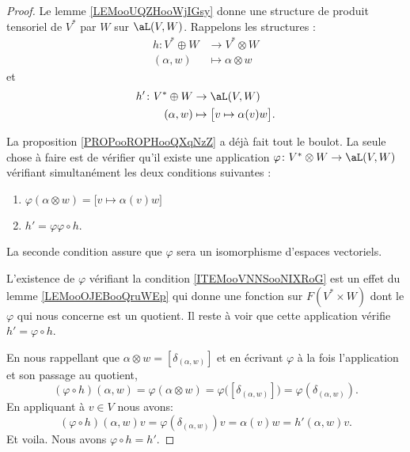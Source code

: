 \begin{proof}
    Le lemme \ref{LEMooUQZHooWjIGsy} donne une structure de produit tensoriel de \( V^*\) par \( W\) sur \( \aL(V,W)\). Rappelons les structures :
    \begin{equation}
        \begin{aligned}
            h\colon V^*\oplus W&\to V^*\otimes W \\
            (\alpha,w)&\mapsto \alpha\otimes w 
        \end{aligned}
    \end{equation}
    et
    \begin{equation}
        \begin{aligned}
            h'\colon V^*\oplus W&\to \aL(V,W) \\
            (\alpha,w)&\mapsto \big[ v\mapsto \alpha(v)w \big].
        \end{aligned}
    \end{equation}

    La proposition \ref{PROPooROPHooQXqNzZ} a déjà fait tout le boulot. La seule chose à faire est de vérifier qu'il existe une application \( \varphi\colon V^*\otimes W\to \aL(V,W)\) vérifiant simultanément les deux conditions suivantes :
    \begin{enumerate}
        \item       \label{ITEMooVNNSooNIXRoG}
            \( \varphi(\alpha\otimes w)=\big[ v\mapsto \alpha(v)w \big]\)
        \item 
            \( h'=\varphi\varphi\circ h\).
    \end{enumerate}
    La seconde condition assure que \( \varphi\) sera un isomorphisme d'espaces vectoriels.

    L'existence de \( \varphi\) vérifiant la condition \ref{ITEMooVNNSooNIXRoG} est un effet du lemme \ref{LEMooOJEBooQruWEp} qui donne une fonction sur \( F(V^*\times W)\) dont le \( \varphi\) qui nous concerne est un quotient. Il reste à voir que cette application vérifie \( h'=\varphi\circ h\).
    
    En nous rappellant que \( \alpha\otimes w=[\delta_{(\alpha,w)}]\) et en écrivant \( \varphi\) à la fois l'application et son passage au quotient,
    \begin{equation}
        (\varphi\circ h)(\alpha,w)=\varphi(\alpha\otimes w)=\varphi\big( [\delta_{(\alpha,w)}] \big)=\varphi(\delta_{(\alpha,w)}).
    \end{equation}
    En appliquant à \( v\in V\) nous avons:
    \begin{equation}
        (\varphi\circ h)(\alpha,w)v=\varphi(\delta_{(\alpha,w)})v=\alpha(v)w=h'(\alpha,w)v.
    \end{equation}
    Et voila. Nous avons \( \varphi\circ h=h'\).
\end{proof}


